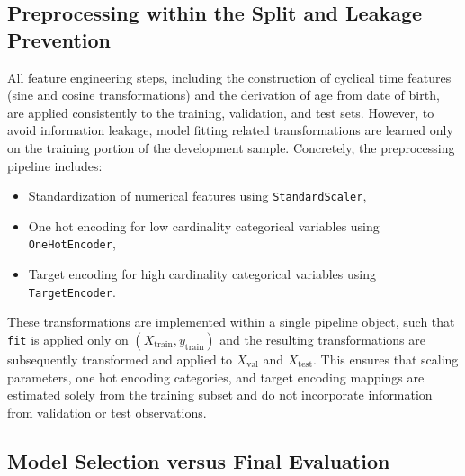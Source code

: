 \documentclass[oneside,12pt,parskip=half,american,numbers=noenddot]{scrreprt}
\begin{document}
\subsection{Preprocessing within the Split and Leakage Prevention}

All feature engineering steps, including the construction of cyclical time features (sine and cosine transformations) and the derivation of age from date of birth, are applied consistently to the training, validation, and test sets. However, to avoid information leakage, model fitting related transformations are learned only on the training portion of the development sample. Concretely, the preprocessing pipeline includes:
\begin{itemize}
    \item Standardization of numerical features using \texttt{StandardScaler},
    \item One hot encoding for low cardinality categorical variables using \texttt{OneHotEncoder},
    \item Target encoding for high cardinality categorical variables using \texttt{TargetEncoder}.
\end{itemize}
These transformations are implemented within a single pipeline object, such that \texttt{fit} is applied only on \((X_{\text{train}}, y_{\text{train}})\) and the resulting transformations are subsequently transformed and applied to \(X_{\text{val}}\) and \(X_{\text{test}}\). This ensures that scaling parameters, one hot encoding categories, and target encoding mappings are estimated solely from the training subset and do not incorporate information from validation or test observations.

\subsection{Model Selection versus Final Evaluation}
\end{document}
